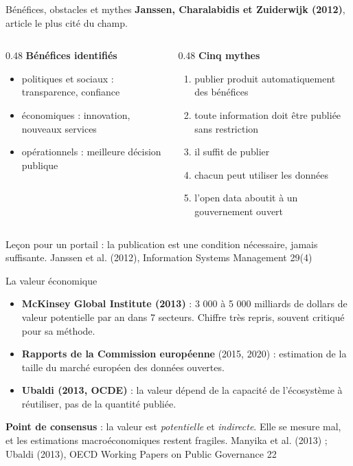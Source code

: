 \documentclass[11pt,aspectratio=169]{beamer}
\newcommand{\refc}[1]{\textcolor{gris}{\footnotesize #1}}
\begin{document}
\begin{frame}{Bénéfices, obstacles et mythes}
  \textbf{Janssen, Charalabidis et Zuiderwijk (2012)}, article le plus cité du champ.
  \vspace{0.4em}
  \begin{columns}[T]
    \begin{column}{0.48\textwidth}
      \textbf{\color{bleu}Bénéfices identifiés}
      \begin{itemize}
        \item politiques et sociaux : transparence, confiance
        \item économiques : innovation, nouveaux services
        \item opérationnels : meilleure décision publique
      \end{itemize}
    \end{column}
    \begin{column}{0.48\textwidth}
      \textbf{\color{bleu}Cinq mythes}
      \begin{enumerate}
        \small
        \item publier produit automatiquement des bénéfices
        \item toute information doit être publiée sans restriction
        \item il suffit de publier
        \item chacun peut utiliser les données
        \item l'open data aboutit à un gouvernement ouvert
      \end{enumerate}
    \end{column}
  \end{columns}
  \vspace{0.5em}
  \alert{Leçon pour un portail} : la publication est une condition nécessaire, jamais suffisante.
  \vfill
  \refc{Janssen et al. (2012), Information Systems Management 29(4)}
\end{frame}

\begin{frame}{La valeur économique}
  \begin{itemize}
    \item \textbf{McKinsey Global Institute (2013)} : 3 000 à 5 000 milliards de dollars de valeur potentielle par an dans 7 secteurs. Chiffre très repris, souvent critiqué pour sa méthode.
    \item \textbf{Rapports de la Commission européenne} (2015, 2020) : estimation de la taille du marché européen des données ouvertes.
    \item \textbf{Ubaldi (2013, OCDE)} : la valeur dépend de la capacité de l'écosystème à réutiliser, pas de la quantité publiée.
  \end{itemize}
  \vspace{0.6em}
  \textbf{Point de consensus} : la valeur est \emph{potentielle} et \emph{indirecte}. Elle se mesure mal, et les estimations macroéconomiques restent fragiles.
  \vfill
  \refc{Manyika et al. (2013) ; Ubaldi (2013), OECD Working Papers on Public Governance 22}
\end{frame}
\end{document}
